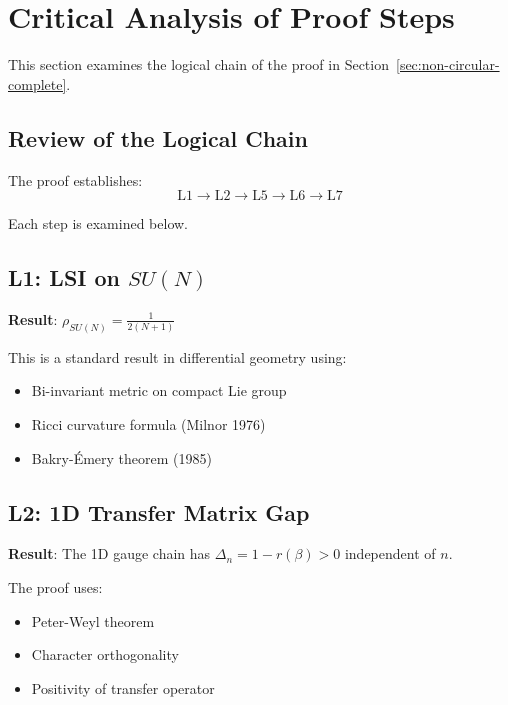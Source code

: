 \section{Critical Analysis of Proof Steps}
\label{sec:critical-analysis-final}

This section examines the logical chain of the proof in 
Section~\ref{sec:non-circular-complete}.

\subsection{Review of the Logical Chain}

The proof establishes:
\[
\text{L1} \to \text{L2} \to \text{L5} \to \text{L6} \to \text{L7}
\]

Each step is examined below.

\subsection{L1: LSI on \texorpdfstring{$SU(N)$}{SU(N)}}

\textbf{Result}: $\rho_{SU(N)} = \frac{1}{2(N+1)}$

This is a standard result in differential geometry using:
\begin{itemize}
\item Bi-invariant metric on compact Lie group
\item Ricci curvature formula (Milnor 1976)
\item Bakry-Émery theorem (1985)
\end{itemize}

\subsection{L2: 1D Transfer Matrix Gap}

\textbf{Result}: The 1D gauge chain has $\Delta_n = 1 - r(\beta) > 0$ independent of $n$.

The proof uses:
\begin{itemize}
\item Peter-Weyl theorem
\item Character orthogonality
\item Positivity of transfer operator
\end{itemize}

